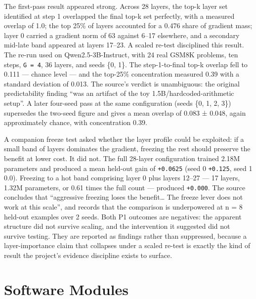 \documentclass[12pt,a4paper]{report}
\newcommand{\longtok}[1]{\texttt{\seqsplit{#1}}}
\begin{document}
The first-pass result appeared strong. Across 28 layers, the top-k layer
set identified at step 1 overlapped the final top-k set perfectly, with
a measured overlap of 1.0; the top 25\% of layers accounted for a 0.476
share of gradient mass; layer 0 carried a gradient norm of 63 against
6--17 elsewhere, and a secondary mid-late band appeared at layers
17--23. A scaled re-test disciplined this result. The re-run used
\longtok{p1\_\allowbreak{}layer\_\allowbreak{}profile\_\allowbreak{}scaled.py} on Qwen2.5-3B-Instruct, with 24
real GSM8K problems, ten steps, \texttt{G\ =\ 4}, 36 layers, and seeds
\{0, 1\}. The step-1-to-final top-k overlap fell to 0.111 --- chance
level --- and the top-25\% concentration measured 0.39 with a standard
deviation of 0.013. The source's verdict is unambiguous: the original
predictability finding ``was an artifact of the toy
1.5B/hardcoded-arithmetic setup''. A later four-seed pass at the same
configuration (seeds \{0, 1, 2, 3\}) supersedes the two-seed figure and
gives a mean overlap of 0.083 ± 0.048, again approximately chance, with
concentration 0.39.

A companion freeze test asked whether the layer profile could be
exploited: if a small band of layers dominates the gradient, freezing
the rest should preserve the benefit at lower cost. It did not. The full
28-layer configuration trained 2.18M parameters and produced a mean
held-out gain of \texttt{+0.0625} (seed 0 \texttt{+0.125}, seed 1 0.0).
Freezing to a hot band comprising layer 0 plus layers 12--27 --- 17
layers, 1.32M parameters, or 0.61 times the full count --- produced
\texttt{+0.000}. The source concludes that ``aggressive freezing loses
the benefit\ldots{} The freeze lever does not work at this scale'', and
records that the comparison is underpowered at n = 8 held-out examples
over 2 seeds. Both P1 outcomes are negatives: the apparent structure did
not survive scaling, and the intervention it suggested did not survive
testing. They are reported as findings rather than suppressed, because a
layer-importance claim that collapses under a scaled re-test is exactly
the kind of result the project's evidence discipline exists to surface.

\section{Software Modules}\label{software-modules}
\end{document}
